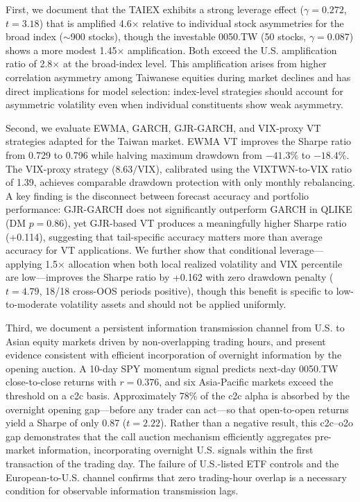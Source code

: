 First, we document that the TAIEX exhibits a strong leverage effect ($\gamma = 0.272$, $t = 3.18$) that is amplified 4.6$\times$ relative to individual stock asymmetries for the broad index ($\sim$900 stocks), though the investable 0050.TW (50 stocks, $\gamma = 0.087$) shows a more modest 1.45$\times$ amplification. Both exceed the U.S. amplification ratio of 2.8$\times$ at the broad-index level. This amplification arises from higher correlation asymmetry among Taiwanese equities during market declines and has direct implications for model selection: index-level strategies should account for asymmetric volatility even when individual constituents show weak asymmetry.

Second, we evaluate EWMA, GARCH, GJR-GARCH, and VIX-proxy VT strategies adapted for the Taiwan market. EWMA VT improves the Sharpe ratio from 0.729 to 0.796 while halving maximum drawdown from $-41.3\%$ to $-18.4\%$. The VIX-proxy strategy ($8.63/\text{VIX}$), calibrated using the VIXTWN-to-VIX ratio of 1.39, achieves comparable drawdown protection with only monthly rebalancing. A key finding is the disconnect between forecast accuracy and portfolio performance: GJR-GARCH does not significantly outperform GARCH in QLIKE (DM $p = 0.86$), yet GJR-based VT produces a meaningfully higher Sharpe ratio (+0.114), suggesting that tail-specific accuracy matters more than average accuracy for VT applications. We further show that conditional leverage---applying 1.5$\times$ allocation when both local realized volatility and VIX percentile are low---improves the Sharpe ratio by +0.162 with zero drawdown penalty ($t = 4.79$, 18/18 cross-OOS periods positive), though this benefit is specific to low-to-moderate volatility assets and should not be applied uniformly.

Third, we document a persistent information transmission channel from U.S. to Asian equity markets driven by non-overlapping trading hours, and present evidence consistent with efficient incorporation of overnight information by the opening auction. A 10-day SPY momentum signal predicts next-day 0050.TW close-to-close returns with $r = 0.376$, and six Asia-Pacific markets exceed the \citet{harvey2016} threshold on a c2c basis. Approximately 78\% of the c2c alpha is absorbed by the overnight opening gap---before any trader can act---so that open-to-open returns yield a Sharpe of only 0.87 ($t = 2.22$). Rather than a negative result, this c2c--o2o gap demonstrates that the call auction mechanism efficiently aggregates pre-market information, incorporating overnight U.S. signals within the first transaction of the trading day. The failure of U.S.-listed ETF controls and the European-to-U.S. channel confirms that zero trading-hour overlap is a necessary condition for observable information transmission lags.

